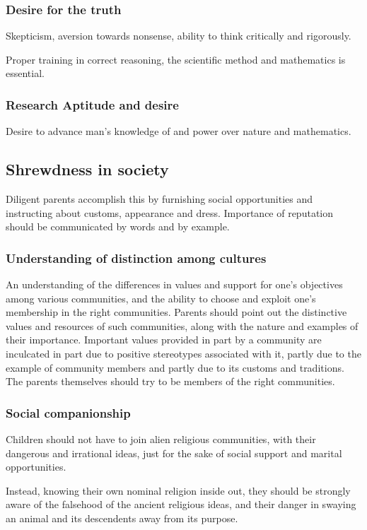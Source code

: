 \documentclass[oneside, article]{memoir}
\begin{document}
\subsubsection{Desire for the truth}
Skepticism, aversion towards nonsense, ability to think critically and rigorously.

\subitem Proper training in correct reasoning, the scientific method and mathematics is essential.

\subsubsection{Research Aptitude and desire}
Desire to advance man's knowledge of and power over nature and mathematics.

\subsection{Shrewdness in society}
Diligent parents accomplish this by furnishing social opportunities and instructing about customs, appearance and dress. Importance of reputation should be communicated by words and by example.

\subsubsection{Understanding of distinction among cultures}
An understanding of the differences in values and support for one's objectives among various communities, and the ability to choose and exploit one's membership in the right communities.
\subitem Parents should point out the distinctive values and resources of such communities, along with the nature and examples of their importance.
\subitem Important values provided in part by a community are inculcated in part due to positive stereotypes associated with it, partly due to the example of community members and partly due to its customs and traditions.
\subitem The parents themselves should try to be members of the right communities.

\subsubsection{Social companionship}
Children should not have to join alien religious communities, with their dangerous and irrational ideas, just for the sake of social support and marital opportunities.

\subitem Instead, knowing their own nominal religion inside out, they should be strongly aware of the falsehood of the ancient religious ideas, and their danger in swaying an animal and its descendents away from its purpose.
\end{document}
